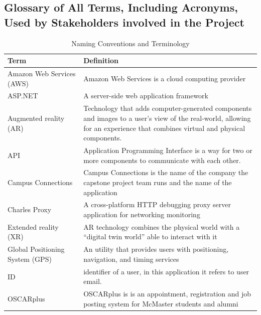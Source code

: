 \documentclass[12pt]{article}
\begin{document}
\subsection{Glossary of All Terms, Including Acronyms, Used by Stakeholders
involved in the Project}
\begin{table}[H]
    \centering
    \begin{tabular}{|p{0.3\linewidth} | p{0.7\linewidth}| }
    \hline
    \textbf{Term} & \textbf{Definition}\\
    \hline
    Amazon Web Services (AWS) & Amazon Web Services is a cloud computing provider\\
    \hline
    ASP.NET & A server-side web application framework\\
    \hline
    Augmented reality (AR) & Technology that adds computer-generated components and images to a user’s view of the real-world, allowing for an experience that combines virtual and physical components.\\
    \hline
    API & Application Programming Interface is a way for two or more components to communicate with each other.\\
    \hline
    Campus Connections & Campus Connections is the name of the company the capstone project team runs and the name of the application\\
    \hline
    Charles Proxy & A cross-platform HTTP debugging proxy server application for networking monitoring\\
    \hline
    Extended reality (XR) & AR technology combines the physical world with a ``digital twin world'' able to interact with it\\
    \hline
    Global Positioning System (GPS) & An utility that provides users with positioning, navigation, and timing services\\
    \hline
    ID & identifier of a user, in this application it refers to user email.\\
    \hline
    OSCARplus & OSCARplus is is an appointment, registration and job posting system for McMaster students and alumni\\
    \hline
    \end{tabular}
    \caption{Naming Conventions and Terminology}
    \label{TblNaming}
\end{table}
\end{document}
